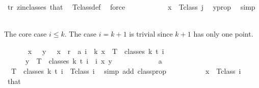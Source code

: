 \begin{isabellebody}
\ tr\ z{\isacharunderscore}{\kern0pt}in{\isacharunderscore}{\kern0pt}classes\ that\ \isamarkupfalse%
\ T{\isacharunderscore}{\kern0pt}class{\isacharunderscore}{\kern0pt}def\ \isamarkupfalse%
\ force\isanewline
\ \ \ \ \ \ \ \ \isamarkupfalse%
\ \isamarkupfalse%
\ {\isachardoublequoteopen}x\ {\isasymin}\ T{\isacharunderscore}{\kern0pt}class\ j{\isachardoublequoteclose}\ \isamarkupfalse%
\ y{\isacharunderscore}{\kern0pt}prop\ \isamarkupfalse%
\ simp\isanewline
\ \ \ \ \ \ \isamarkupfalse%
\isanewline
\ \ \ \ \isamarkupfalse%
%
\begin{isamarkuptext}%
The core case $i \leq k$. The case $i = k+1$ is trivial since $k+1$ has only one point.%
\end{isamarkuptext}\isamarkuptrue%
\ \ \ \ \isamarkupfalse%
\ {\isachardoublequoteopen}{\isasymchi}\ x\ {\isacharequal}{\kern0pt}\ {\isasymchi}\ y\ {\isasymand}\ {\isasymchi}\ x\ {\isacharless}{\kern0pt}\ r{\isachardoublequoteclose}\ \ a{\isacharcolon}{\kern0pt}\ {\isachardoublequoteopen}i\ {\isasymle}\ k{\isachardoublequoteclose}\ {\isachardoublequoteopen}x\ {\isasymin}\ T\ {\isacharbackquote}{\kern0pt}\ classes\ {\isacharparenleft}{\kern0pt}k{\isacharplus}{\kern0pt}{}{\isacharparenright}{\kern0pt}\ t\ i{\isachardoublequoteclose}\isanewline
\ \ \ \ \ \ {\isachardoublequoteopen}y\ {\isasymin}\ T\ {\isacharbackquote}{\kern0pt}\ classes\ {\isacharparenleft}{\kern0pt}k{\isacharplus}{\kern0pt}{}{\isacharparenright}{\kern0pt}\ t\ i{\isachardoublequoteclose}\ \ i\ x\ y\isanewline
\ \ \ \ \isamarkupfalse%
{\isacharminus}{\kern0pt}\isanewline
\ \ \ \ \ \ \isamarkupfalse%
\ a\ \isamarkupfalse%
\ {\isacharasterisk}{\kern0pt}{\isacharcolon}{\kern0pt}\ {\isachardoublequoteopen}T\ {\isacharbackquote}{\kern0pt}\ classes\ {\isacharparenleft}{\kern0pt}k{\isacharplus}{\kern0pt}{}{\isacharparenright}{\kern0pt}\ t\ i\ {\isacharequal}{\kern0pt}\ T{\isacharunderscore}{\kern0pt}class\ i{\isachardoublequoteclose}\ \isamarkupfalse%
\ {\isacharparenleft}{\kern0pt}simp\ add{\isacharcolon}{\kern0pt}\ classprop{\isacharparenright}{\kern0pt}\isanewline
\ \ \ \ \ \ \isamarkupfalse%
\ \isamarkupfalse%
\ \ {\isachardoublequoteopen}x\ {\isasymin}\ T{\isacharunderscore}{\kern0pt}class\ i\ {\isachardoublequoteclose}\ \isamarkupfalse%
\ that\ \isamarkupfalse%

\end{isabellebody}

